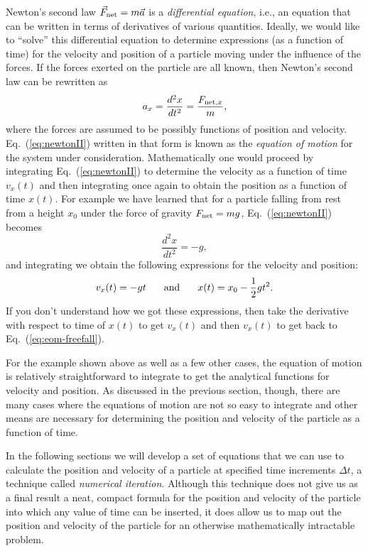 Newton's second law $\vec{F}_{\rm net} = m\vec{a}$ is a {\em
differential equation}, i.e., an equation that can be written in
terms of derivatives of various quantities.  Ideally, we would like
to ``solve'' this differential equation to 
determine expressions (as a function of time) for the velocity and
position of a particle moving under the influence of the forces.
If the forces exerted on the particle are
all known, then Newton's second law can be rewritten as
\begin{equation}
  a_x = \frac{d^2x}{dt^2} = \frac{F_{{\rm net},x}}{m},
  \label{eq:newtonII}
\end{equation}
where the forces are assumed to be possibly functions of position and
velocity.  Eq.~(\ref{eq:newtonII}) written in that form is known as
the {\em equation of motion} for the system under consideration.
Mathematically one would proceed by integrating Eq.~(\ref{eq:newtonII}) 
to determine the velocity as a function of time
$v_x(t)$ and then integrating once again to obtain the position as a
function of time $x(t)$.  For example we have learned that for a
particle falling from rest from a height $x_0$ under the force of
gravity $F_{\rm net} = mg$, Eq.~(\ref{eq:newtonII}) becomes
\begin{equation}
  \frac{d^2x}{dt^2} = -g,
  \label{eq:eom-freefall}
\end{equation}
and integrating we obtain the following expressions for the velocity
and position:
\begin{equation}
  v_x(t) = -gt \mbox{\hspace{0.25in}and\hspace{0.25in}}x(t) = x_0 - 
  \frac{1}{2}gt^2.
\end{equation}
If you don't understand how we got these expressions, then take the
derivative with respect to time of $x(t)$ to get $v_x(t)$ and then
$v_x(t)$ to get back to Eq.~(\ref{eq:eom-freefall}).

For the example shown above as well as a few other cases, the equation
of motion is relatively straightforward to integrate to get the
analytical functions for velocity and position.  As discussed in the previous
section, though, there are many cases
where the equations of motion are not so easy to integrate and other
means are necessary for determining the position and velocity of the
particle as a function of time.

In the following sections we will develop a set of equations that we
can use to calculate the position and velocity of a particle at
specified time increments $\Delta t$, a technique called {\em
  numerical iteration}.  Although this technique does not give us as a
final result a neat, compact formula for the position and velocity of
the particle into which any value of time can be inserted, it does
allow us to map out the position and velocity of the particle for an
otherwise mathematically intractable problem.

